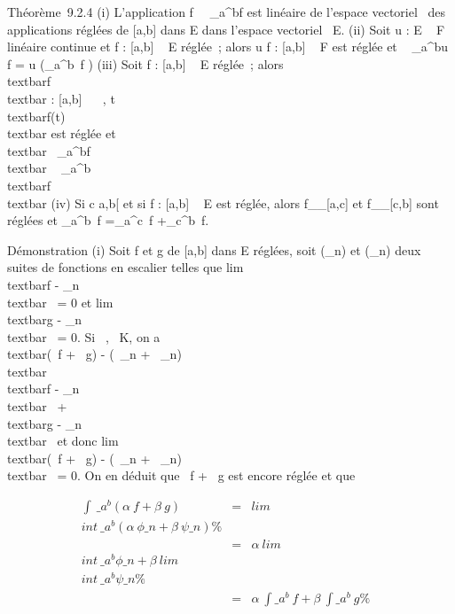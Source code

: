 \documentclass[]{article}
\begin{document}
Théorème~9.2.4 (i) L'application
f\mapsto~\int ~
\_a^bf est linéaire de l'espace vectoriel ~des applications
réglées de {[}a,b{]} dans E dans l'espace vectoriel ~E. (ii) Soit u : E
\rightarrow~ F linéaire continue et f : {[}a,b{]} \rightarrow~ E réglée~; alors u \cdot f :
{[}a,b{]} \rightarrow~ F est réglée et \int ~
\_a^bu \cdot f = u\left
(\int  \_a^b~f\right
) (iii) Soit f : {[}a,b{]} \rightarrow~ E réglée~; alors
\\textbar{}f\\textbar{} : {[}a,b{]} \rightarrow~ ~,
t\mapsto~\\textbar{}f(t)\\textbar{}
est réglée et \\textbar{}\int ~
\_a^bf\\textbar{}
\leq\int ~
\_a^b\\textbar{}f\\textbar{}
(iv) Si c \in{]}a,b{[} et si f : {[}a,b{]} \rightarrow~ E est réglée, alors
f\_\textbar{}\_{[}a,c{]} et
f\_\textbar{}\_{[}c,b{]} sont réglées et
\int  \_a^b~f
=\int  \_a^c~f
+\int  \_c^b~f.

Démonstration (i) Soit f et g de {[}a,b{]} dans E réglées, soit
(\phi\_n) et (\psi\_n) deux suites de fonctions en escalier
telles que lim~\\textbar{}f -
\phi\_n\\textbar{}\infty~ = 0 et
lim~\\textbar{}g -
\psi\_n\\textbar{}\infty~ = 0. Si \alpha~,\beta~ \in K, on a
\\textbar{}(\alpha~f + \beta~g) - (\alpha~\phi\_n +
\beta~\psi\_n)\\textbar{}\infty~
\leq\textbar{}\alpha~\textbar{}\\textbar{}f -
\phi\_n\\textbar{}\infty~ +
\textbar{}\beta~\textbar{}\\textbar{}g -
\psi\_n\\textbar{}\infty~ et donc
lim~\\textbar{}(\alpha~f + \beta~g) -
(\alpha~\phi\_n + \beta~\psi\_n)\\textbar{}\infty~ = 0. On en
déduit que \alpha~f + \beta~g est encore réglée et que

\begin{align*} \int ~
\_a^b(\alpha~f + \beta~g)& =&
lim\\int ~
\_a^b(\alpha~\phi\_ n + \beta~\psi\_n) \%&
\\ & =&
\alpha~lim\\int ~
\_a^b\phi\_ n +
\beta~lim\\int ~
\_a^b\psi\_ n\%& \\ &
=& \alpha~\int  \_a^b~f +
\beta~\int  \_a^b~g \%&
\\ \end{align*}
\end{document}
